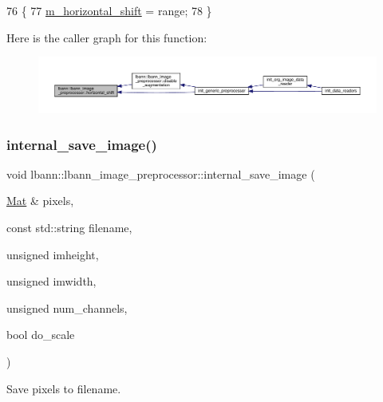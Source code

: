 \begin{DoxyCode}
76                                      \{
77     \hyperlink{classlbann_1_1lbann__image__preprocessor_a636f59ffe470f996677601df6179bc41}{m\_horizontal\_shift} = range;
78   \}
\end{DoxyCode}
Here is the caller graph for this function\+:\nopagebreak
\begin{figure}[H]
\begin{center}
\leavevmode
\includegraphics[width=350pt]{classlbann_1_1lbann__image__preprocessor_ae62596b4af5d1940aa0499cde2bdd005_icgraph}
\end{center}
\end{figure}
\mbox{\label{classlbann_1_1lbann__image__preprocessor_a3c4f4cc5c90233696566a35a62a1708c}} 
\subsubsection{\texorpdfstring{internal\+\_\+save\+\_\+image()}{internal\_save\_image()}}
{\footnotesize\ttfamily void lbann\+::lbann\+\_\+image\+\_\+preprocessor\+::internal\+\_\+save\+\_\+image (\begin{DoxyParamCaption}\item[{\hyperlink{base_8hpp_a68f11fdc31b62516cb310831bbe54d73}{Mat} \&}]{pixels,  }\item[{const std\+::string}]{filename,  }\item[{unsigned}]{imheight,  }\item[{unsigned}]{imwidth,  }\item[{unsigned}]{num\+\_\+channels,  }\item[{bool}]{do\+\_\+scale }\end{DoxyParamCaption})\hspace{0.3cm}{\ttfamily [protected]}}

Save pixels to filename. 

